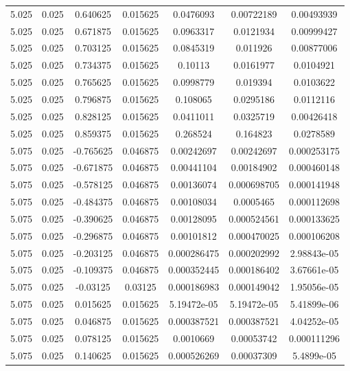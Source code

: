 \begin{table}[bh]
\begin{center}
{\begin{tabular}{ccccccc}
5.025	 & 0.025 & 	0.640625	 & 0.015625	 & 0.0476093	 & 0.00722189	 & 0.00493939 \\ 
5.025	 & 0.025 & 	0.671875	 & 0.015625	 & 0.0963317	 & 0.0121934	 & 0.00999427 \\ 
5.025	 & 0.025 & 	0.703125	 & 0.015625	 & 0.0845319	 & 0.011926	 & 0.00877006 \\ 
5.025	 & 0.025 & 	0.734375	 & 0.015625	 & 0.10113	 & 0.0161977	 & 0.0104921 \\ 
5.025	 & 0.025 & 	0.765625	 & 0.015625	 & 0.0998779	 & 0.019394	 & 0.0103622 \\ 
5.025	 & 0.025 & 	0.796875	 & 0.015625	 & 0.108065	 & 0.0295186	 & 0.0112116 \\ 
5.025	 & 0.025 & 	0.828125	 & 0.015625	 & 0.0411011	 & 0.0325719	 & 0.00426418 \\ 
5.025	 & 0.025 & 	0.859375	 & 0.015625	 & 0.268524	 & 0.164823	 & 0.0278589 \\ 
5.075	 & 0.025 & 	-0.765625	 & 0.046875	 & 0.00242697	 & 0.00242697	 & 0.000253175 \\ 
5.075	 & 0.025 & 	-0.671875	 & 0.046875	 & 0.00441104	 & 0.00184902	 & 0.000460148 \\ 
5.075	 & 0.025 & 	-0.578125	 & 0.046875	 & 0.00136074	 & 0.000698705	 & 0.000141948 \\ 
5.075	 & 0.025 & 	-0.484375	 & 0.046875	 & 0.00108034	 & 0.0005465	 & 0.000112698 \\ 
5.075	 & 0.025 & 	-0.390625	 & 0.046875	 & 0.00128095	 & 0.000524561	 & 0.000133625 \\ 
5.075	 & 0.025 & 	-0.296875	 & 0.046875	 & 0.00101812	 & 0.000470025	 & 0.000106208 \\ 
5.075	 & 0.025 & 	-0.203125	 & 0.046875	 & 0.000286475	 & 0.000202992	 & 2.98843e-05 \\ 
5.075	 & 0.025 & 	-0.109375	 & 0.046875	 & 0.000352445	 & 0.000186402	 & 3.67661e-05 \\ 
5.075	 & 0.025 & 	-0.03125	 & 0.03125	 & 0.000186983	 & 0.000149042	 & 1.95056e-05 \\ 
5.075	 & 0.025 & 	0.015625	 & 0.015625	 & 5.19472e-05	 & 5.19472e-05	 & 5.41899e-06 \\ 
5.075	 & 0.025 & 	0.046875	 & 0.015625	 & 0.000387521	 & 0.000387521	 & 4.04252e-05 \\ 
5.075	 & 0.025 & 	0.078125	 & 0.015625	 & 0.0010669	 & 0.00053742	 & 0.000111296 \\ 
5.075	 & 0.025 & 	0.140625	 & 0.015625	 & 0.000526269	 & 0.00037309	 & 5.4899e-05 \\ 

\end{tabular}}
\end{center}
\end{table}
